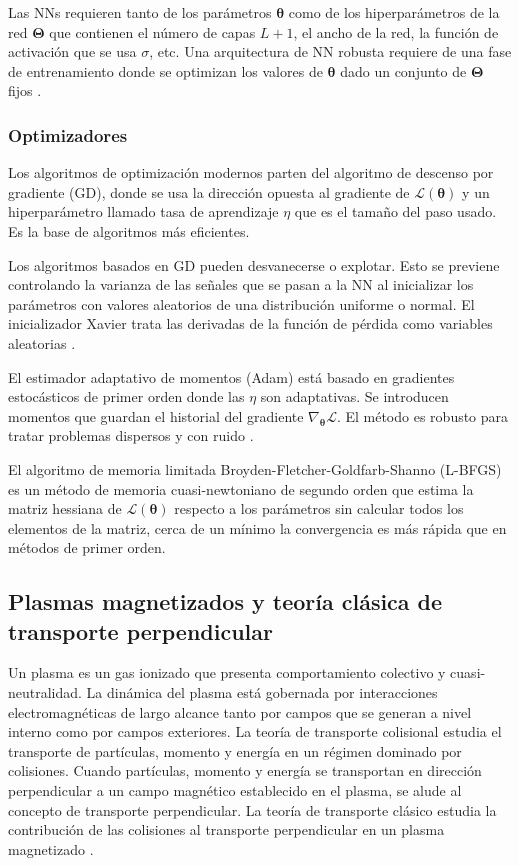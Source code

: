Las NNs requieren tanto de los parámetros $\bm{\theta}$ como de los hiperparámetros de la red $\bm{\Theta}$ que contienen el número de capas $L + 1$, el ancho de la red, la función de activación que se usa $\sigma$, etc. Una arquitectura de NN robusta requiere de una fase de entrenamiento donde se optimizan los valores de $\bm{\theta}$ dado un conjunto de $\bm{\Theta}$ fijos \cite{ray2023}.

\subsubsection{Optimizadores}

Los algoritmos de optimización modernos parten del algoritmo de descenso por gradiente (GD), donde se usa la dirección opuesta al gradiente de $\mathcal{L}(\bm{\theta})$ y un hiperparámetro llamado tasa de aprendizaje $\eta$ que es el tamaño del paso usado. Es la base de algoritmos más eficientes. 

Los algoritmos basados en GD pueden desvanecerse o explotar. Esto se previene controlando la varianza de las señales que se pasan a la NN al inicializar los parámetros con valores aleatorios de una distribución uniforme o normal. El inicializador Xavier trata las derivadas de la función de pérdida como variables aleatorias \cite{glorot2010}.

El estimador adaptativo de momentos (Adam) está basado en gradientes estocásticos de primer orden donde las $\eta$ son adaptativas. Se introducen momentos que guardan el historial del gradiente $\nabla_{\bm{\theta}} \mathcal{L}$. El método es robusto para tratar problemas dispersos y con ruido \cite{kingma2017}.

El algoritmo de memoria limitada Broyden-Fletcher-Goldfarb-Shanno (L-BFGS) es un método de memoria cuasi-newtoniano de segundo orden que estima la matriz hessiana de $\mathcal{L}(\bm{\theta})$ respecto a los parámetros sin calcular todos los elementos de la matriz, cerca de un mínimo la convergencia es más rápida que en métodos de primer orden. 

\subsection{Plasmas magnetizados y teoría clásica de transporte perpendicular}

Un plasma es un gas ionizado que presenta comportamiento colectivo y cuasi-neutralidad. La dinámica del plasma está gobernada por interacciones electromagnéticas de largo alcance tanto por campos que se generan a nivel interno como por campos exteriores. La teoría de transporte colisional estudia el transporte de partículas, momento y energía  en un régimen dominado por colisiones. Cuando partículas, momento y energía se transportan en dirección perpendicular a un campo magnético establecido en el plasma, se alude al concepto de transporte perpendicular. La teoría de transporte clásico estudia la contribución de las colisiones al transporte perpendicular en un plasma magnetizado \cite{helander2005}.

